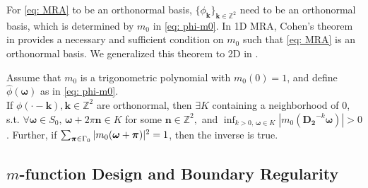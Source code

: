 For  \eqref{eq: MRA} to be an orthonormal basis,  $\{\phi_{\boldsymbol{k}}\}_{\boldsymbol{k}\in\mathbb{Z}^2}$ need to be an orthonormal basis, which is determined by $m_0$ in \eqref{eq: phi-m0}. In 1D MRA, Cohen's theorem in \cite{cohen1992biorthogonal} provides a necessary and sufficient condition on $m_0$ such that \eqref{eq: MRA} is an orthonormal basis. %
We generalized this theorem to 2D in \cite{yin2014orthshear}.
\begin{thm}\label{thm: basis cond}
Assume that $m_0$ is a trigonometric polynomial with $m_0(0)=1$, and define $\hat{\phi}(\boldsymbol{\omega})$ as in \eqref{eq: phi-m0}.\\
If $\phi(\cdot - \boldsymbol{k}),\boldsymbol{k}\in\mathbb{Z}^2$ are orthonormal, then $\exists K$ containing a neighborhood of 0, s.t. $\forall\boldsymbol{\omega}\in S_0,\,\boldsymbol{\omega}+2\pi\mathbf{n}\in K$ for some $\mathbf{n}\in\mathbb{Z}^2, $ and $\inf_{k>0,\,\boldsymbol{\omega}\in K}|m_0(\mathbf{D_2}^{-k}\boldsymbol{\omega})| >0$. 
 Further, if $\sum_{\boldsymbol{\boldsymbol{\pi}}\in \Gamma_0} |m_0(\boldsymbol{\omega}+\boldsymbol{\pi})|^2 = 1$, then the inverse is true.
\end{thm}

\subsection{$m$-function Design and Boundary Regularity}\label{sec: design}

